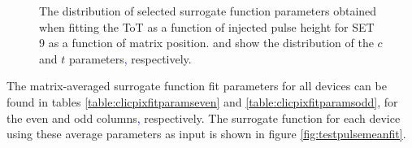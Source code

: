 \begin{figure}[h!]
\centering
{}
\caption[The distribution of selected surrogate function parameters obtained when fitting the ToT as a function of injected pulse height for SET 9 as a function of matrix position.  \protect{} and \protect{} show the distribution of the $c$ and $t$ parameters\textcolor{blue}{,} respectively.]{The distribution of selected surrogate function parameters obtained when fitting the ToT as a function of injected pulse height for SET 9 as a function of matrix position.  \protect{} and \protect{} show the distribution of the $c$ and $t$ parameters\textcolor{blue}{,} respectively.}
\label{fig:fitparams2d}
\end{figure}

The matrix-averaged surrogate function fit parameters for all devices can be found in tables \ref{table:clicpixfitparamseven} and  \ref{table:clicpixfitparamsodd}, for the even and odd columns\textcolor{blue}{,} respectively.  The surrogate function for each device using these average parameters as input is shown in figure \ref{fig:testpulsemeanfit}.

